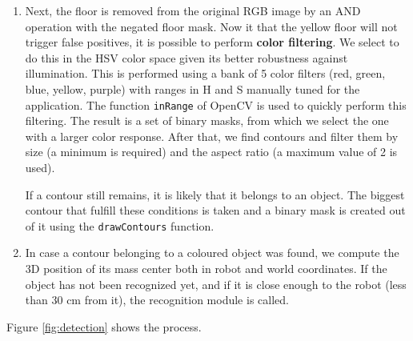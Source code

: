 \begin{enumerate}
\item Next, the floor is removed from the original RGB image by an AND operation with the negated floor mask. Now it that the yellow floor will not trigger false positives, it is possible to perform \textbf{color filtering}. We select to do this in the HSV color space given its better robustness against illumination. This is performed using a bank of 5 color filters (red, green, blue, yellow, purple) with ranges in H and S manually tuned for the application. The function \texttt{inRange} of OpenCV is used to quickly perform this filtering. The result is a set of binary masks, from which we select the one with a larger color response. After that, we find contours and filter them by size (a minimum is required) and the aspect ratio (a maximum value of 2 is used). 

If a contour still remains, it is likely that it belongs to an object. The biggest contour that fulfill these conditions is taken and a binary mask is created out of it using the \texttt{drawContours} function.

\item In case a contour belonging to a coloured object was found, we compute the 3D position of its mass center both in robot and world coordinates. If the object has not been recognized yet, and if it is close enough to the robot (less than 30 cm from it), the recognition module is called.

\end{enumerate}
Figure \ref{fig:detection} shows the process.

